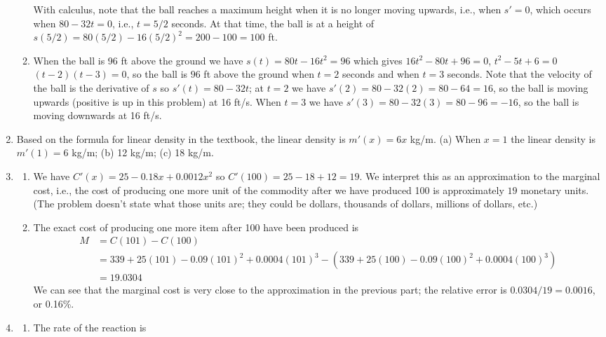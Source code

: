 \documentclass{article}
\begin{document}
\begin{enumerate}
\begin{enumerate}
    With calculus, note that the ball reaches a maximum height when it
    is no longer moving upwards, i.e., when $s'=0$, which occurs when
    $80-32t=0$, i.e., $t=5/2$ seconds.  At that time, the ball is at a
    height of $s(5/2)=80(5/2)-16(5/2)^2=200-100=100$ ft.
  \item When the ball is 96 ft above the ground we have
    $s(t)=80t-16t^2=96$ which gives $16t^2-80t+96=0$, $t^2-5t+6=0$
    $(t-2)(t-3)=0$, so the ball is $96$ ft above the ground when $t=2$
    seconds and when $t=3$ seconds.  Note that the velocity of the
    ball is the derivative of $s$ so $s'(t)=80-32t$; at $t=2$ we have
    $s'(2)=80-32(2)=80-64=16$, so the ball is moving upwards (positive
    is up in this problem) at 16 ft/s.  When $t=3$ we have
    $s'(3)=80-32(3)=80-96=-16$, so the ball is moving downwards at 16
    ft/s.
  \end{enumerate}
\item %
  Based on the formula for linear density in the textbook, the linear
  density is $m'(x)=6x$ kg/m.  (a) When $x=1$ the linear density is
  $m'(1)=6$ kg/m; (b) 12 kg/m; (c) 18 kg/m.
\item %
  \begin{enumerate}
  \item We have $C'(x)=25-0.18x+0.0012x^2$ so $C'(100)=25-18+12=19$.
    We interpret this as an approximation to the marginal cost, i.e.,
    the cost of producing one more unit of the commodity after we have
    produced 100 is approximately $19$ monetary units.  (The problem
    doesn't state what those units are; they could be dollars,
    thousands of dollars, millions of dollars, etc.)
  \item The exact cost of producing one more item after 100 have been
    produced is
    \begin{align*}
      M
      &=C(101)-C(100)
      \\
      &= 339+25(101)-0.09(101)^2+0.0004(101)^3
      -(339+25(100)-0.09(100)^2+0.0004(100)^3)
      \\
      &= 19.0304
    \end{align*}
    We can see that the marginal cost is very close to the
    approximation in the previous part; the relative error is
    $0.0304/19=0.0016$, or 0.16\%.
  \end{enumerate}
\item %
  \begin{enumerate}
  \item The rate of the reaction is 
    \begin{equation*}

\end{equation*}
\end{enumerate}
\end{enumerate}
\end{document}
